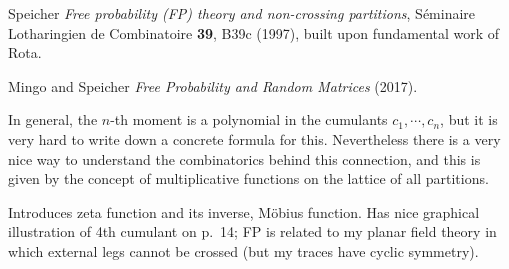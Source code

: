 \begin{description}
Speicher {\em Free probability (FP) theory and non-crossing partitions},
S{\'e}minaire Lotharingien de Combinatoire
     {{\bf 39}, B39c} (1997),
built upon fundamental work of Rota.

Mingo and Speicher
{\em Free Probability and Random Matrices} (2017).

In general, the $n$-th moment is a polynomial in the cumulants $c_1, \cdots ,
c_n$, but it is very hard to write down a concrete formula for this.
Nevertheless there is a very nice way to understand the combinatorics
behind this connection, and this is given by the concept of multiplicative
functions on the lattice of all partitions.

Introduces zeta function and its inverse, M{\"o}bius function. Has nice
graphical illustration of 4th cumulant on p.~14; FP is related to my planar
field theory in which external legs cannot be crossed (but my traces have
cyclic symmetry).







\end{description}


\printbibliography[heading=subbibintoc,title={References}]
